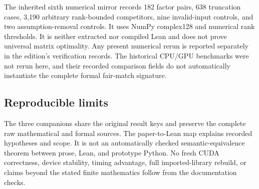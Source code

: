 The inherited sixth numerical mirror records 182 factor pairs, 638 truncation cases, 3,190 arbitrary rank-bounded competitors, nine invalid-input controls, and two assumption-removal controls. It uses NumPy complex128 and numerical rank thresholds. It is neither extracted nor compiled Lean and does not prove universal matrix optimality. Any present numerical rerun is reported separately in the edition's verification records. The historical CPU/GPU benchmarks were not rerun here, and their recorded comparison fields do not automatically instantiate the complete formal fair-match signature.

\subsection{Reproducible limits}
The three companions share the original result keys and preserve the complete raw mathematical and formal sources. The paper-to-Lean map explains recorded hypotheses and scope. It is not an automatically checked semantic-equivalence theorem between prose, Lean, and prototype Python. No fresh CUDA correctness, device stability, timing advantage, full imported-library rebuild, or claims beyond the stated finite mathematics follow from the documentation checks.
